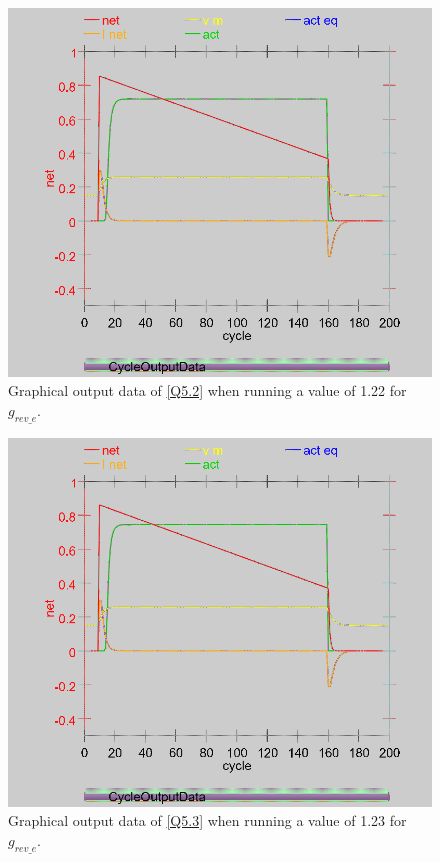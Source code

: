 \begin{multicols}{2}
\begin{figure}[H]
\centering
\includegraphics[scale=0.3]{Media/Main/EQ1/2.5.S2G.png}
\caption{Graphical output data of \cref{Q5.2} when running a value of 1.22 for $g_{rev\_e}$.}
\label{Q5.5}
\end{figure}

\begin{figure}[H]
\centering
\includegraphics[scale=0.3]{Media/Main/EQ1/2.5.S3G.png}
\caption{Graphical output data of \cref{Q5.3} when running a value of 1.23 for $g_{rev\_e}$.}
\label{Q5.6}
\end{figure}
\end{multicols}